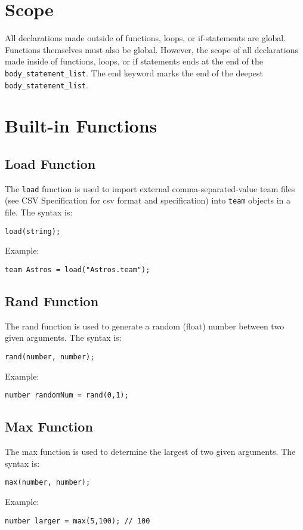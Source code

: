 \section{Scope}
All declarations made outside of functions, loops, or if-statements
are global. Functions themselves must also be global. However, the
scope of all declarations made inside of functions, loops, or if
statements ends at the end of the \texttt{body\_statement\_list}. The
end keyword marks the end of the deepest
\texttt{body\_statement\_list}.

\section{Built-in Functions}

\subsection{Load Function}
The \texttt{load} function is used to import external
comma-separated-value team files (see CSV Specification for csv format
and specification) into \texttt{team} objects in a file. The syntax
is:

\begin{verbatim}
load(string);
\end{verbatim}
Example: 
\begin{verbatim}
team Astros = load("Astros.team");
\end{verbatim}

\subsection{Rand Function}
The rand function is used to generate a random (float) number between
two given arguments. The syntax is:

\begin{verbatim}
rand(number, number);
\end{verbatim}
Example: 
\begin{verbatim}
number randomNum = rand(0,1);
\end{verbatim}

\subsection{Max Function}
The max function is used to determine the largest of two given
arguments. The syntax is:

\begin{verbatim}
max(number, number);
\end{verbatim}
Example: 
\begin{verbatim}
number larger = max(5,100); // 100
\end{verbatim}
 
